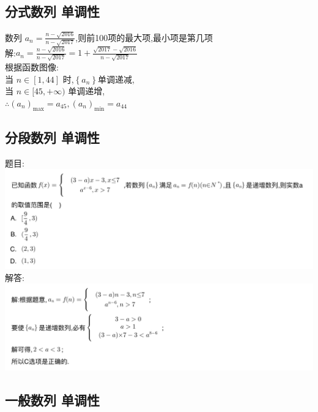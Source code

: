 \documentclass[hyperref, UTF8,11pt,a4paper]{ctexart} %
\begin{document}

\subsection{分式数列 单调性}
{\color{red} 数列 $a_{n}=\frac{n-\sqrt{2016}}{n-\sqrt{2017}}$,则前100项的最大项,最小项是第几项 }\\
解:$a_{n}=\frac{n-\sqrt{2016}}{n-\sqrt{2017}}=1+\frac{\sqrt{2017}-\sqrt{2016}}{n-\sqrt{2017}}$ \\
根据函数图像: \\
当 $n \in[1,44]$ 时,$\left\{a_{n}\right\}$单调递减, \\
当 $n \in[45,+\infty)$ 单调递增, \\
$\therefore \left(a_{n}\right)_{\max }=a_{45},\left(a_{n}\right)_{\min }=a_{44}$


\subsection{分段数列 单调性}
{\color{red}  题目: } \\
\includegraphics[width=500pt]  {pic/shulie/fenduanhanshutimu.jpg} \\
解答: \\
\includegraphics[width=500pt]  {pic/shulie/fenduanhanshudaan.jpg} \\


\subsection{一般数列 单调性}
\end{document}
